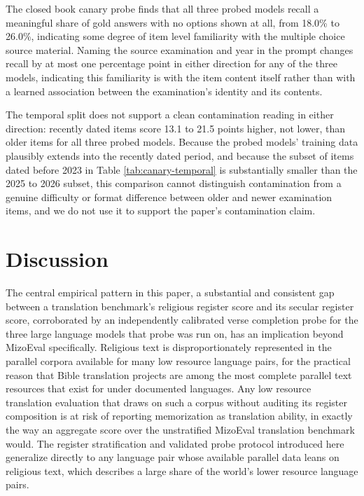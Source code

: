 \documentclass[pdflatex,sn-mathphys-ay]{sn-jnl}
\begin{document}
The closed book canary probe finds that all three probed models recall a meaningful share of gold answers with no options shown at all, from 18.0\% to 26.0\%, indicating some degree of item level familiarity with the multiple choice source material. Naming the source examination and year in the prompt changes recall by at most one percentage point in either direction for any of the three models, indicating this familiarity is with the item content itself rather than with a learned association between the examination's identity and its contents.

The temporal split does not support a clean contamination reading in either direction: recently dated items score 13.1 to 21.5 points higher, not lower, than older items for all three probed models. Because the probed models' training data plausibly extends into the recently dated period, and because the subset of items dated before 2023 in Table \ref{tab:canary-temporal} is substantially smaller than the 2025 to 2026 subset, this comparison cannot distinguish contamination from a genuine difficulty or format difference between older and newer examination items, and we do not use it to support the paper's contamination claim.

\section{Discussion}
\label{sec:discussion}

The central empirical pattern in this paper, a substantial and consistent gap between a translation benchmark's religious register score and its secular register score, corroborated by an independently calibrated verse completion probe for the three large language models that probe was run on, has an implication beyond MizoEval specifically. Religious text is disproportionately represented in the parallel corpora available for many low resource language pairs, for the practical reason that Bible translation projects are among the most complete parallel text resources that exist for under documented languages. Any low resource translation evaluation that draws on such a corpus without auditing its register composition is at risk of reporting memorization as translation ability, in exactly the way an aggregate score over the unstratified MizoEval translation benchmark would. The register stratification and validated probe protocol introduced here generalize directly to any language pair whose available parallel data leans on religious text, which describes a large share of the world's lower resource language pairs.
\end{document}
